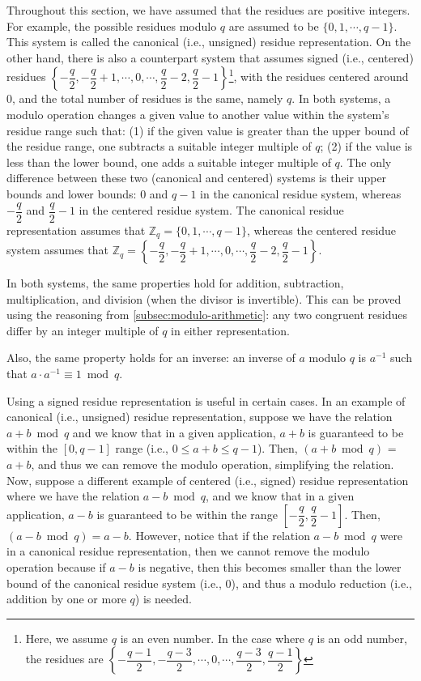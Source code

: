 Throughout this section, we have assumed that the residues are positive integers. For example, the possible residues modulo $q$ are assumed to be $\{0, 1, \cdots, q-1\}$. This system is called the canonical (i.e., unsigned) residue representation. On the other hand, there is also a counterpart system that assumes signed (i.e., centered) residues $\left\{-\dfrac{q}{2}, -\dfrac{q}{2} + 1, \cdots, 0, \cdots, \dfrac{q}{2} - 2, \dfrac{q}{2} - 1\right\}$\footnote{Here, we assume $q$ is an even number. In the case where $q$ is an odd number, the residues are $\left\{ -\dfrac{q-1}{2}, -\dfrac{q-3}{2}, \cdots, 0, \cdots, \dfrac{q-3}{2}, \dfrac{q-1}{2}\right\}$}, with the residues centered around $0$, and the total number of residues is the same, namely $q$. In both systems, a modulo operation changes a given value to another value within the system's residue range such that: (1) if the given value is greater than the upper bound of the residue range, one subtracts a suitable integer multiple of $q$; (2) if the value is less than the lower bound, one adds a suitable integer multiple of $q$. The only difference between these two (canonical and centered) systems is their upper bounds and lower bounds: $0$ and $q-1$ in the canonical residue system, whereas $-\dfrac{q}{2}$ and $\dfrac{q}{2} - 1$ in the centered residue system. The canonical residue representation assumes that $\mathbb{Z}_q = \{0, 1, \cdots, q-1\}$, whereas the centered residue system assumes that $\mathbb{Z}_q = \left\{-\dfrac{q}{2}, -\dfrac{q}{2} + 1, \cdots, 0, \cdots, \dfrac{q}{2} - 2, \dfrac{q}{2} - 1\right\}$.

In both systems, the same properties hold for addition, subtraction, multiplication, and division (when the divisor is invertible). This can be proved using the reasoning from \autoref{subsec:modulo-arithmetic}: any two congruent residues differ by an integer multiple of $q$ in either representation.

Also, the same property holds for an inverse: an inverse of $a$ modulo $q$ is $a^{-1}$ such that $a \cdot a^{-1} \equiv 1 \bmod q$. 

Using a signed residue representation is useful in certain cases. In an example of canonical (i.e., unsigned) residue representation, suppose we have the relation $a + b \bmod q$ and we know that in a given application, $a + b$ is guaranteed to be within the $[0, q-1]$ range (i.e., $0 \leq a + b \leq q-1$). Then, $(a + b \bmod q)$ = $a + b$, and thus we can remove the modulo operation, simplifying the relation. Now, suppose a different example of centered (i.e., signed) residue representation where we have the relation $a - b \bmod q$, and we know that in a given application, $a - b$ is guaranteed to be within the range $\left[-\dfrac{q}{2}, \dfrac{q}{2} - 1\right]$. Then, $(a - b \bmod q) = a - b$. However, notice that if the relation $a - b \bmod q$ were in a canonical residue representation, then we cannot remove the modulo operation because if $a - b$ is negative, then this becomes smaller than the lower bound of the canonical residue system (i.e., $0$), and thus a modulo reduction (i.e., addition by one or more $q$) is needed. 

